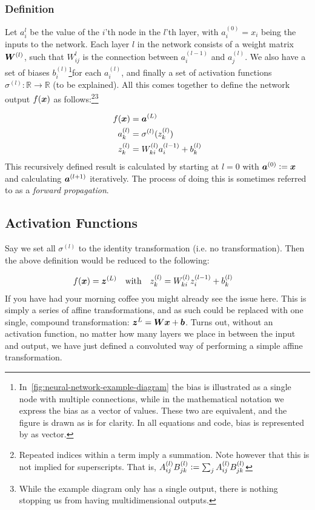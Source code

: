 \documentclass[Thesis.tex]{subfiles}
\begin{document}
\subsubsection{Definition}
\label{sec:ml-ann-forward-def}

 Let $a_i^{l}$ be the value of the $i$'th node in the $l$'th layer, with
$a_i^{(0)}=x_i$ being the inputs to the network. Each layer $l$ in the network
consists of a weight matrix $\bm{W}^{(l)}$, such that $W_{ij}^{l}$ is the
connection between $a_i^{(l-1)}$ and $a_j^{(l)}$. We also have a set of biases
$b_i^{(l)}$\footnote{In~\cref{fig:neural-network-example-diagram} the bias is
illustrated as a single node with multiple connections, while in the
mathematical notation we express the bias as a vector of values. These two are
equivalent, and the figure is drawn as is for clarity. In all equations and
code, bias is represented by as vector.}for each $a_i^{(l)}$, and finally a set
of activation functions $\sigma^{(l)}: \mathbb{R}\to\mathbb{R}$ (to be
explained). All this comes together to define the network output $f(\bm{x})$ as
follows:\footnote{Repeated indices within a term imply a summation. Note however
that this is not implied for superscripts. That is, $A_{ij}^{(l)}B_{jk}^{(l)}
\vcentcolon= \sum_{j} A_{ij}^{(l)}B_{jk}^{(l)}$}\footnote{While the example diagram
only has a single output, there is nothing stopping us from having
multidimensional outputs.}


 \begin{align}
   f(\bm{x}) &= \bm{a}^{(L)}\\
   a_k^{(l)} &= \sigma^{(l)}(z_k^{(l)})\\
   z_k^{(l)} &= W^{(l)}_{ki}a_i^{(l-1)} + b^{(l)}_k
 \end{align}
This recursively defined result is calculated by starting at $l=0$ with
$\bm{a}^{(0)}\vcentcolon= \bm{x}$ and calculating $\bm{a}^{(l+1)}$ iteratively. The
process of doing this is sometimes referred to as a \emph{forward propagation}.


\subsection{Activation Functions}
\label{sec:ml-activation-functions}

Say we set all $\sigma^{(l)}$ to the identity transformation (i.e. no
transformation). Then the above definition would be reduced to the following:

\begin{align}
  f(\vx) = \vb{z}^{(L)}\qq{with}
   z_k^{(l)} &= W^{(l)}_{ki}z_i^{(l-1)} + b^{(l)}_k
\end{align}
If you have had your morning coffee you might already see the issue here. This
is simply a series of affine transformations, and as such could be replaced with
one single, compound transformation: $\bm{z}^{L} = \bm{W}\bm{x} + \bm{b}$. Turns
out, without an activation function, no matter how many layers we place in
between the input and output, we have just defined a convoluted way of
performing a simple affine transformation.
\end{document}
